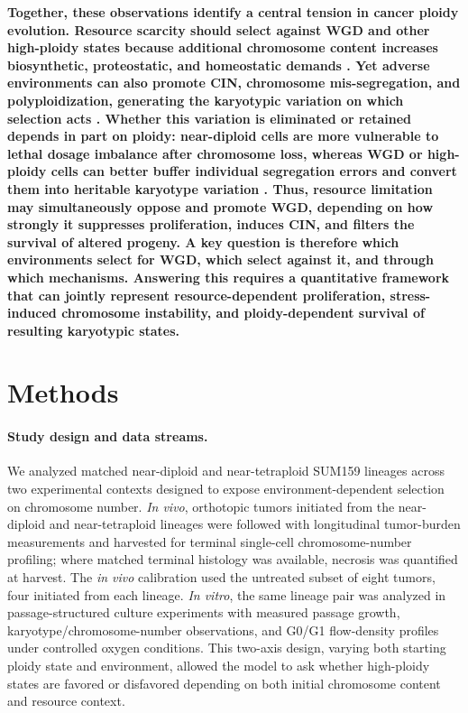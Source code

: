 \documentclass[11pt]{article}
\begin{document}
\textbf{Together, these observations identify a central tension in cancer ploidy evolution. Resource scarcity should select against WGD and other high-ploidy states because additional chromosome content increases biosynthetic, proteostatic, and homeostatic demands \cite{donovan_hyperdiploid_2014,nowicka_interactions_2025,beck_energetics_2025}. Yet adverse environments can also promote CIN, chromosome mis-segregation, and polyploidization, generating the karyotypic variation on which selection acts \cite{nowicka_interactions_2025,beck_energetics_2025}. Whether this variation is eliminated or retained depends in part on ploidy: near-diploid cells are more vulnerable to lethal dosage imbalance after chromosome loss, whereas WGD or high-ploidy cells can better buffer individual segregation errors and convert them into heritable karyotype variation \cite{lopez_interplay_2020,elizalde_markov_2018,santaguida_chromosome_2017,beck_alfa-k_2025}. Thus, resource limitation may simultaneously oppose and promote WGD, depending on how strongly it suppresses proliferation, induces CIN, and filters the survival of altered progeny. A key question is therefore which environments select for WGD, which select against it, and through which mechanisms. Answering this requires a quantitative framework that can jointly represent resource-dependent proliferation, stress-induced chromosome instability, and ploidy-dependent survival of resulting karyotypic states.}

\section*{Methods}

\paragraph{Study design and data streams.}
We analyzed matched near-diploid and near-tetraploid SUM159 lineages across two experimental contexts designed to expose environment-dependent selection on chromosome number. \textit{In vivo}, orthotopic tumors initiated from the near-diploid and near-tetraploid lineages were followed with longitudinal tumor-burden measurements and harvested for terminal single-cell chromosome-number profiling; where matched terminal histology was available, necrosis was quantified at harvest. The \textit{in vivo} calibration used the untreated subset of eight tumors, four initiated from each lineage. \textit{In vitro}, the same lineage pair was analyzed in passage-structured culture experiments with measured passage growth, karyotype/chromosome-number observations, and G0/G1 flow-density profiles under controlled oxygen conditions. This two-axis design, varying both starting ploidy state and environment, allowed the model to ask whether high-ploidy states are favored or disfavored depending on both initial chromosome content and resource context.
\end{document}

